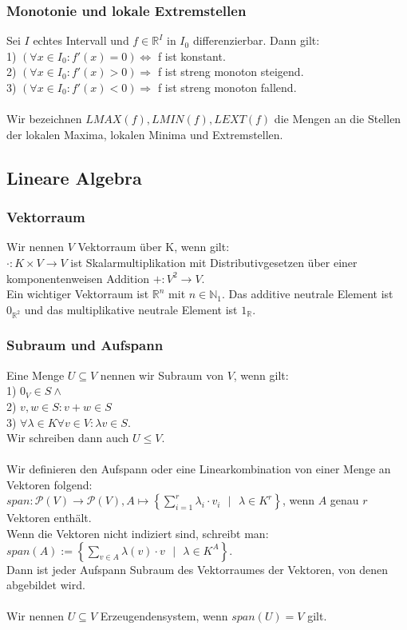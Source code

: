 \documentclass{article}
\begin{document}
\subsubsection*{Monotonie und lokale Extremstellen}
Sei \(I\) echtes Intervall und \(f \in \mathbb R ^I\) in \(I_0\) differenzierbar. Dann gilt:\\
1) \((\forall x \in I_0: f'(x) = 0) \Longleftrightarrow \) f ist konstant. \\
2) \((\forall x \in I_0: f'(x) > 0) \Longrightarrow \) f ist streng monoton steigend. \\
3) \((\forall x \in I_0: f'(x) < 0) \Longrightarrow \) f ist streng monoton fallend. \\ \\
Wir bezeichnen \(LMAX(f), LMIN(f), LEXT(f)\) die Mengen an die Stellen der lokalen Maxima, lokalen Minima und Extremstellen.
\subsection*{Lineare Algebra}
\subsubsection*{Vektorraum}
Wir nennen \(V\) Vektorraum über K, wenn gilt: \\
\(\cdot : K \times V \rightarrow V\) ist Skalarmultiplikation mit Distributivgesetzen über einer komponentenweisen Addition \(+: V^2 \rightarrow V\). \\
Ein wichtiger Vektorraum ist \(\mathbb R^n\) mit \(n \in \mathbb N_1\). Das additive neutrale Element ist \(0_{\mathbb R ^2}\) und das multiplikative neutrale Element ist \(1_\mathbb R\).
\subsubsection*{Subraum und Aufspann}
Eine Menge \(U \subseteq V\) nennen wir Subraum von \(V\), wenn gilt:\\
1) \(0_V \in S \wedge\) \\
2) \(v,w \in S: v + w \in S\) \\
3) \(\forall \lambda \in K \forall v \in V: \lambda v \in S\). \\
Wir schreiben dann auch \(U \le V\). \\ \\
Wir definieren den Aufspann oder eine Linearkombination von einer Menge an Vektoren folgend:\\
\(span: \mathcal P(V) \rightarrow \mathcal P(V), A \mapsto \left\{ \sum_{i=1}^{r} \lambda_i \cdot v_i \text{ }| \text{ } \lambda \in K^r \right\}\), wenn \(A\) genau \(r\) Vektoren enthält. \\
Wenn die Vektoren nicht indiziert sind, schreibt man: \(span(A) := \left\{\sum_{v\in A}^{} \lambda(v) \cdot v \text{ }| \text{ } \lambda \in K^A \right\}\). \\
Dann ist jeder Aufspann Subraum des Vektorraumes der Vektoren, von denen abgebildet wird. \\ \\
Wir nennen \(U \subseteq V\) Erzeugendensystem, wenn \(span(U) = V\) gilt.
\end{document}
